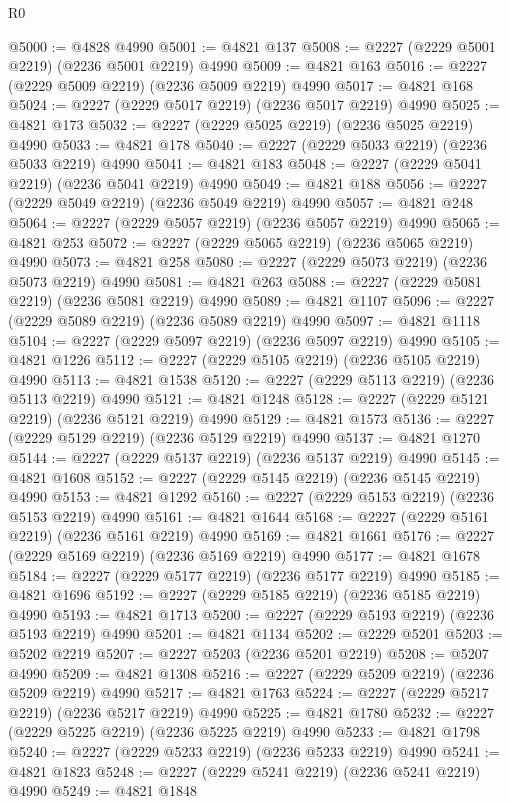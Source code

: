 \begin{lexlean}{R0}
\begin{coremodule}
@5000 := @4828 @4990
@5001 := @4821 @137
@5008 := @2227 (@2229 @5001 @2219) (@2236 @5001 @2219) @4990
@5009 := @4821 @163
@5016 := @2227 (@2229 @5009 @2219) (@2236 @5009 @2219) @4990
@5017 := @4821 @168
@5024 := @2227 (@2229 @5017 @2219) (@2236 @5017 @2219) @4990
@5025 := @4821 @173
@5032 := @2227 (@2229 @5025 @2219) (@2236 @5025 @2219) @4990
@5033 := @4821 @178
@5040 := @2227 (@2229 @5033 @2219) (@2236 @5033 @2219) @4990
@5041 := @4821 @183
@5048 := @2227 (@2229 @5041 @2219) (@2236 @5041 @2219) @4990
@5049 := @4821 @188
@5056 := @2227 (@2229 @5049 @2219) (@2236 @5049 @2219) @4990
@5057 := @4821 @248
@5064 := @2227 (@2229 @5057 @2219) (@2236 @5057 @2219) @4990
@5065 := @4821 @253
@5072 := @2227 (@2229 @5065 @2219) (@2236 @5065 @2219) @4990
@5073 := @4821 @258
@5080 := @2227 (@2229 @5073 @2219) (@2236 @5073 @2219) @4990
@5081 := @4821 @263
@5088 := @2227 (@2229 @5081 @2219) (@2236 @5081 @2219) @4990
@5089 := @4821 @1107
@5096 := @2227 (@2229 @5089 @2219) (@2236 @5089 @2219) @4990
@5097 := @4821 @1118
@5104 := @2227 (@2229 @5097 @2219) (@2236 @5097 @2219) @4990
@5105 := @4821 @1226
@5112 := @2227 (@2229 @5105 @2219) (@2236 @5105 @2219) @4990
@5113 := @4821 @1538
@5120 := @2227 (@2229 @5113 @2219) (@2236 @5113 @2219) @4990
@5121 := @4821 @1248
@5128 := @2227 (@2229 @5121 @2219) (@2236 @5121 @2219) @4990
@5129 := @4821 @1573
@5136 := @2227 (@2229 @5129 @2219) (@2236 @5129 @2219) @4990
@5137 := @4821 @1270
@5144 := @2227 (@2229 @5137 @2219) (@2236 @5137 @2219) @4990
@5145 := @4821 @1608
@5152 := @2227 (@2229 @5145 @2219) (@2236 @5145 @2219) @4990
@5153 := @4821 @1292
@5160 := @2227 (@2229 @5153 @2219) (@2236 @5153 @2219) @4990
@5161 := @4821 @1644
@5168 := @2227 (@2229 @5161 @2219) (@2236 @5161 @2219) @4990
@5169 := @4821 @1661
@5176 := @2227 (@2229 @5169 @2219) (@2236 @5169 @2219) @4990
@5177 := @4821 @1678
@5184 := @2227 (@2229 @5177 @2219) (@2236 @5177 @2219) @4990
@5185 := @4821 @1696
@5192 := @2227 (@2229 @5185 @2219) (@2236 @5185 @2219) @4990
@5193 := @4821 @1713
@5200 := @2227 (@2229 @5193 @2219) (@2236 @5193 @2219) @4990
@5201 := @4821 @1134
@5202 := @2229 @5201
@5203 := @5202 @2219
@5207 := @2227 @5203 (@2236 @5201 @2219)
@5208 := @5207 @4990
@5209 := @4821 @1308
@5216 := @2227 (@2229 @5209 @2219) (@2236 @5209 @2219) @4990
@5217 := @4821 @1763
@5224 := @2227 (@2229 @5217 @2219) (@2236 @5217 @2219) @4990
@5225 := @4821 @1780
@5232 := @2227 (@2229 @5225 @2219) (@2236 @5225 @2219) @4990
@5233 := @4821 @1798
@5240 := @2227 (@2229 @5233 @2219) (@2236 @5233 @2219) @4990
@5241 := @4821 @1823
@5248 := @2227 (@2229 @5241 @2219) (@2236 @5241 @2219) @4990
@5249 := @4821 @1848

\end{coremodule}
\end{lexlean}
